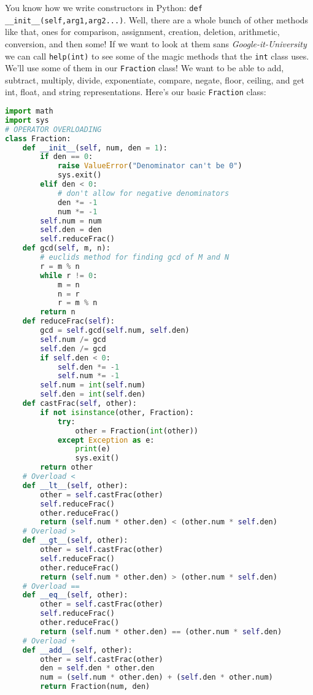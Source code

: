 \documentclass[12pt, twoside, reqno]{book}
\begin{document}
You know how we write constructors in Python: \texttt{def \_\_init\_\_(self,arg1,arg2...)}. Well, there are a whole bunch of other methods like that, ones for comparison, assignment, creation, deletion, arithmetic, conversion, and then some! If we want to look at them sans \textit{Google-it-University} we can call \texttt{help(int)} to see some of the magic methods that the \texttt{int} class uses. We'll use some of them in our \texttt{Fraction} class! We want to be able to add, subtract, multiply, divide, exponentiate, compare, negate, floor, ceiling, and get int, float, and string representations. Here's our basic \texttt{Fraction} class:
\begin{lstlisting}[language=Python]
import math
import sys
# OPERATOR OVERLOADING
class Fraction:
    def __init__(self, num, den = 1):
        if den == 0:
            raise ValueError("Denominator can't be 0")
            sys.exit()
        elif den < 0:
            # don't allow for negative denominators
            den *= -1
            num *= -1
        self.num = num
        self.den = den
        self.reduceFrac()
    def gcd(self, m, n):
        # euclids method for finding gcd of M and N
        r = m % n
        while r != 0:
            m = n
            n = r
            r = m % n
        return n
    def reduceFrac(self):
        gcd = self.gcd(self.num, self.den)
        self.num /= gcd
        self.den /= gcd
        if self.den < 0:
            self.den *= -1
            self.num *= -1
        self.num = int(self.num)
        self.den = int(self.den)
    def castFrac(self, other):
        if not isinstance(other, Fraction):
            try:
                other = Fraction(int(other))
            except Exception as e:
                print(e)
                sys.exit()
        return other
    # Overload <
    def __lt__(self, other):
        other = self.castFrac(other)
        self.reduceFrac()
        other.reduceFrac()
        return (self.num * other.den) < (other.num * self.den)
    # Overload >
    def __gt__(self, other):
        other = self.castFrac(other)
        self.reduceFrac()
        other.reduceFrac()
        return (self.num * other.den) > (other.num * self.den)
    # Overload ==
    def __eq__(self, other):
        other = self.castFrac(other)
        self.reduceFrac()
        other.reduceFrac()
        return (self.num * other.den) == (other.num * self.den)
    # Overload +
    def __add__(self, other):
        other = self.castFrac(other)
        den = self.den * other.den
        num = (self.num * other.den) + (self.den * other.num)
        return Fraction(num, den)

\end{lstlisting}
\end{document}
